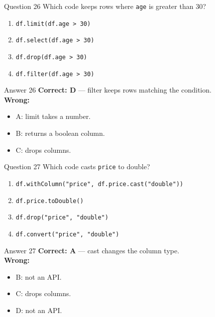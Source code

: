 \documentclass[aspectratio=169,11pt]{beamer}
\begin{document}
\begin{frame}{Question 26}
Which code keeps rows where \texttt{age} is greater than 30?
\begin{enumerate}[label=\Alph*.]
\item \texttt{df.limit(df.age > 30)}
\item \texttt{df.select(df.age > 30)}
\item \texttt{df.drop(df.age > 30)}
\item \texttt{df.filter(df.age > 30)}
\end{enumerate}
\end{frame}
\begin{frame}{Answer 26}
\textbf{Correct: D} --- filter keeps rows matching the condition.\\
\vspace{0.5em}
\textbf{Wrong:}
\begin{itemize}
\item A: limit takes a number.
\item B: returns a boolean column.
\item C: drops columns.
\end{itemize}
\end{frame}

\begin{frame}{Question 27}
Which code casts \texttt{price} to double?
\begin{enumerate}[label=\Alph*.]
\item \texttt{df.withColumn("price", df.price.cast("double"))}
\item \texttt{df.price.toDouble()}
\item \texttt{df.drop("price", "double")}
\item \texttt{df.convert("price", "double")}
\end{enumerate}
\end{frame}
\begin{frame}{Answer 27}
\textbf{Correct: A} --- cast changes the column type.\\
\vspace{0.5em}
\textbf{Wrong:}
\begin{itemize}
\item B: not an API.
\item C: drops columns.
\item D: not an API.
\end{itemize}
\end{frame}
\end{document}
